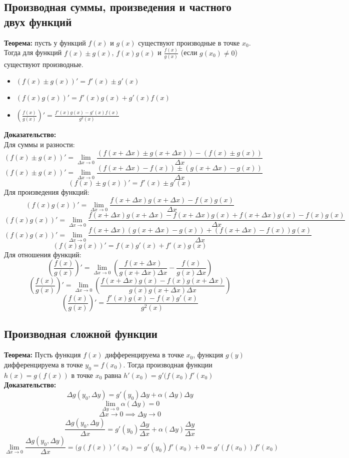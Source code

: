 \documentclass{article}
\newcommand{\theorem}{\textbf{Теорема:} }
\newcommand{\proof}{\textbf{Доказательство:} }
\begin{document}
    \subsection*{Производная суммы, произведения и частного двух функций}
        \theorem пусть у функций $f(x)$ и $g(x)$ существуют производные в точке $x_0$. Тогда для функций $f(x) \pm g(x)$, $f(x)g(x)$ и $\frac{f(x)}{g(x)}$ (если $g(x_0) \neq 0$)
        существуют производные.
        \begin{itemize}
            \item $ \left( f(x) \pm g(x) \right)' = f'(x) \pm g'(x) $
            \item $ (f(x)g(x))' = f'(x)g(x) + g'(x)f(x) $
            \item $ \left( \frac{f(x)}{g(x)} \right)' = \frac{f'(x)g(x) - g'(x)f(x)}{g^2(x)} $
        \end{itemize}
        \proof
        \\
        Для суммы и разности:
        \[ (f(x) \pm g(x))' = \lim_{\Delta x \to 0} \frac{\left( f(x + \Delta x) \pm g(x + \Delta x) \right) - \left( f(x) \pm g(x) \right)}{\Delta x} \]
        \[ (f(x) \pm g(x))' = \lim_{\Delta x \to 0} \frac{\left( f(x + \Delta x) - f(x) \right) \pm \left( g(x + \Delta x) -  g(x) \right)}{\Delta x} \]
        \[ (f(x) \pm g(x))' = f'(x) \pm g'(x) \]
        Для произведения функций:
        \[ (f(x)g(x))' = \lim_{\Delta x \to 0} \frac{f(x + \Delta x)g(x + \Delta x) - f(x)g(x)}{\Delta x} \]
        \[ (f(x)g(x))' = \lim_{\Delta x \to 0} \frac{f(x + \Delta x)g(x + \Delta x) - f(x + \Delta x)g(x) + f(x + \Delta x)g(x) - f(x)g(x)}{\Delta x} \]
        \[ (f(x)g(x))' = \lim_{\Delta x \to 0} \frac{f(x + \Delta x)(g(x + \Delta x) - g(x)) + (f(x + \Delta x) - f(x))g(x)}{\Delta x} \]
        \[ (f(x)g(x))' = f(x)g'(x) + f'(x)g(x) \]
        Для отношения функций:
        \[ \left( \frac{f(x)}{g(x)} \right)' = \lim_{\Delta x \to 0} \left( \frac{f(x + \Delta x)}{ g(x + \Delta x) \Delta x } - \frac{f(x)}{ g(x) \Delta x } \right) \]
        \[ \left( \frac{f(x)}{g(x)} \right)' = \lim_{\Delta x \to 0} \left( \frac{f(x + \Delta x) g(x) - f(x) g(x + \Delta x)}{ g(x) g(x + \Delta x) \Delta x } \right) \]
        \[ \left( \frac{f(x)}{g(x)} \right)' = \frac{f'(x) g(x) - f(x) g'(x)}{g^2(x)} \]
        
    \subsection*{Производная сложной функции}
        \theorem Пусть функция $f(x)$ дифференцируема в точке $x_0$, функция $g(y)$ дифференцируема в точке $y_0 = f(x_0)$. Тогда производная функции
        $h(x) = g(f(x))$ в точке $x_0$ равна $h'(x_0) = g'(f(x_0)f'(x_0)$
        \\
        \proof
        \[ \Delta g(y_0, \Delta y) = g'(y_0) \Delta y + \alpha (\Delta y) \Delta y \]
        \[ \lim_{\Delta y \to 0} \alpha (\Delta y) = 0 \]
        \[ \Delta x \to 0 \implies \Delta y \to 0 \]
        \[ \frac{\Delta g(y_0, \Delta y)}{\Delta x} = g'(y_0) \frac{\Delta y}{\Delta x} + \alpha (\Delta y) \frac{\Delta y}{\Delta x} \]
        \[ \lim_{\Delta x \to 0} \frac{\Delta g(y_0, \Delta y)}{\Delta x} = (g(f(x))'(x_0) = g'(y_0)f'(x_0) + 0 = g'(f(x_0))f'(x_0) \]
        
\end{document}
